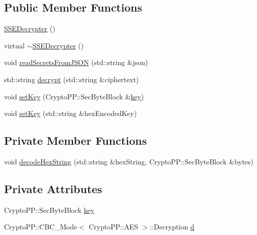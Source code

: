 \subsection*{Public Member Functions}
\begin{DoxyCompactItemize}
\item 
\hyperlink{classSSEDecrypter_a3ae3f44a17d8b2abb66252d5dee2bf92}{S\+S\+E\+Decrypter} ()
\item 
virtual \hyperlink{classSSEDecrypter_ab99776ce887ce3a992a21def645baf26}{$\sim$\+S\+S\+E\+Decrypter} ()
\item 
void \hyperlink{classSSEDecrypter_a1bdc685b8ea9c5bcc2b29f0c9a3ca7bf}{read\+Secrets\+From\+J\+S\+ON} (std\+::string \&json)
\item 
std\+::string \hyperlink{classSSEDecrypter_afc1522b78aed502f8ca94163fc030ffa}{decrypt} (std\+::string \&ciphertext)
\item 
void \hyperlink{classSSEDecrypter_afb19d398b4862298a831a020d61ffef7}{set\+Key} (Crypto\+P\+P\+::\+Sec\+Byte\+Block \&\hyperlink{classSSEDecrypter_a05c8a6317f2de2cfd37c5474d616d16a}{key})
\item 
void \hyperlink{classSSEDecrypter_a86d8cc2754814cfe59ee69ddf900b1f4}{set\+Key} (std\+::string \&hex\+Encoded\+Key)
\end{DoxyCompactItemize}
\subsection*{Private Member Functions}
\begin{DoxyCompactItemize}
\item 
void \hyperlink{classSSEDecrypter_a4be8d581100ecdbe9a8b75c29f65800c}{decode\+Hex\+String} (std\+::string \&hex\+String, Crypto\+P\+P\+::\+Sec\+Byte\+Block \&bytes)
\end{DoxyCompactItemize}
\subsection*{Private Attributes}
\begin{DoxyCompactItemize}
\item 
Crypto\+P\+P\+::\+Sec\+Byte\+Block \hyperlink{classSSEDecrypter_a05c8a6317f2de2cfd37c5474d616d16a}{key}
\item 
Crypto\+P\+P\+::\+C\+B\+C\+\_\+\+Mode$<$ Crypto\+P\+P\+::\+A\+ES $>$\+::Decryption \hyperlink{classSSEDecrypter_a339c0a434bd2a434b548d9d9e6d6762c}{d}
\end{DoxyCompactItemize}


